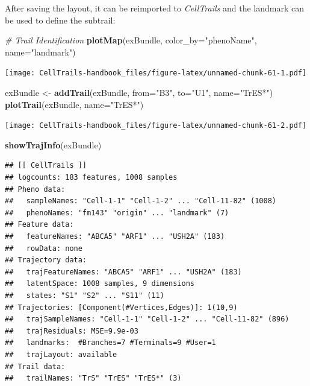 \documentclass[]{book}
\newenvironment{Shaded}{\begin{snugshade}}{\end{snugshade}}
\newcommand{\KeywordTok}[1]{\textcolor[rgb]{0.13,0.29,0.53}{\textbf{#1}}}
\newcommand{\DataTypeTok}[1]{\textcolor[rgb]{0.13,0.29,0.53}{#1}}
\newcommand{\StringTok}[1]{\textcolor[rgb]{0.31,0.60,0.02}{#1}}
\newcommand{\CommentTok}[1]{\textcolor[rgb]{0.56,0.35,0.01}{\textit{#1}}}
\newcommand{\NormalTok}[1]{#1}
\theoremstyle{definition}
\theoremstyle{definition}
\theoremstyle{definition}
\theoremstyle{remark}
\begin{document}
After saving the layout, it can be reimported to \emph{CellTrails} and
the landmark can be used to define the subtrail:

\begin{Shaded}
\begin{Highlighting}[]
\CommentTok{# Trail Identification}
\KeywordTok{plotMap}\NormalTok{(exBundle, }\DataTypeTok{color_by=}\StringTok{"phenoName"}\NormalTok{, }\DataTypeTok{name=}\StringTok{"landmark"}\NormalTok{)}
\end{Highlighting}
\end{Shaded}

\texttt{[image: CellTrails-handbook\_files/figure-latex/unnamed-chunk-61-1.pdf]}

\begin{Shaded}
\begin{Highlighting}[]
\NormalTok{exBundle <-}\StringTok{ }\KeywordTok{addTrail}\NormalTok{(exBundle, }\DataTypeTok{from=}\StringTok{"B3"}\NormalTok{, }\DataTypeTok{to=}\StringTok{"U1"}\NormalTok{, }\DataTypeTok{name=}\StringTok{"TrES*"}\NormalTok{)}
\KeywordTok{plotTrail}\NormalTok{(exBundle, }\DataTypeTok{name=}\StringTok{"TrES*"}\NormalTok{)}
\end{Highlighting}
\end{Shaded}

\texttt{[image: CellTrails-handbook\_files/figure-latex/unnamed-chunk-61-2.pdf]}

\begin{Shaded}
\begin{Highlighting}[]
\KeywordTok{showTrajInfo}\NormalTok{(exBundle)}
\end{Highlighting}
\end{Shaded}

\begin{verbatim}
## [[ CellTrails ]] 
## logcounts: 183 features, 1008 samples
## Pheno data: 
##   sampleNames: "Cell-1-1" "Cell-1-2" ... "Cell-11-82" (1008)
##   phenoNames: "fm143" "origin" ... "landmark" (7)
## Feature data: 
##   featureNames: "ABCA5" "ARF1" ... "USH2A" (183)
##   rowData: none
## Trajectory data: 
##   trajFeatureNames: "ABCA5" "ARF1" ... "USH2A" (183)
##   latentSpace: 1008 samples, 9 dimensions
##   states: "S1" "S2" ... "S11" (11)
## Trajectories: [Component(#Vertices,Edges)]: 1(10,9)
##   trajSampleNames: "Cell-1-1" "Cell-1-2" ... "Cell-11-82" (896)
##   trajResiduals: MSE=9.9e-03
##   landmarks:  #Branches=7 #Terminals=9 #User=1
##   trajLayout: available
## Trail data: 
##   trailNames: "TrS" "TrES" "TrES*" (3)
\end{verbatim}
\end{document}
